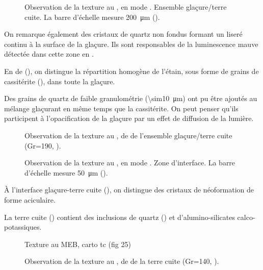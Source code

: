 \begin{figure}[htb]
  \caption{\legendeE 
           Observation de la texture au \MEB, en mode \ERD. 
           Ensemble glaçure/terre cuite. La barre d'échelle mesure 
           \SI{200}{\um} ().}
  \label{MEB:6532_img}
\end{figure}

On remarque également des cristaux de quartz non fondus formant un liseré continu à la surface de la glaçure. Ils sont responsables de la luminescence mauve détectée dans cette zone en \CL.

En \carto de \RX (), on distingue la répartition homogène de l'étain, sous forme de grains de cassitérite (), dans toute la glaçure.

Des grains de quartz de faible granulométrie (\SI{\sim10}{\um}) ont pu être ajoutés au mélange glaçurant en même temps que la cassitérite. On peut penser qu'ils participent à l'opacification de la glaçure par un effet de diffusion de la lumière.

\begin{figure}[htb]
  \caption{\legendeE 
           Observation de la texture au \MEB, \carto de \RX de l'ensemble glaçure/terre cuite (Gr=190, ).}
  \label{MEB:6532_carto_tcgla}
\end{figure}

\begin{figure}[htb]
  \caption{\legendeE 
           Observation de la texture au \MEB, en mode \ERD. 
           Zone d'interface. La barre d'échelle mesure \SI{50}{\um} 
           ().}
  \label{MEB:6532_img_int}
\end{figure}

À l'interface glaçure-terre cuite (), on 
distingue des cristaux de néoformation de forme aciculaire.

La terre cuite () contient des inclusions de 
quartz () et d'alumino-silicates calco-potassiques.

\begin{figure}[htb]
  Texture au MEB, carto tc (fig 25)
  \caption{\legendeE 
           Observation de la texture au \MEB, \carto de \RX de la terre cuite (Gr=140, ).}
  \label{MEB:6532_carto_tc}
\end{figure}


